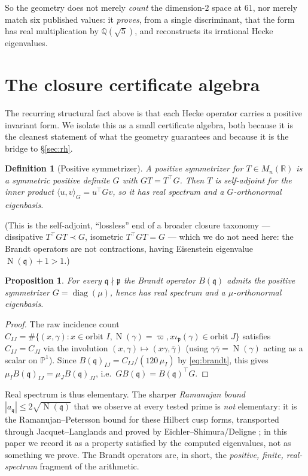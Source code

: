 \documentclass[11pt,a4paper]{article}
\newtheorem{proposition}[theorem]{Proposition}
\newtheorem{definition}[theorem]{Definition}
\newcommand{\Q}{\mathbb{Q}}
\newcommand{\R}{\mathbb{R}}
\newcommand{\PP}{\mathbb{P}}
\newcommand{\fp}{\mathfrak{p}}
\newcommand{\fq}{\mathfrak{q}}
\newcommand{\Brandt}{B}
\DeclareMathOperator{\Nm}{N}
\begin{document}
So the geometry does not merely \emph{count} the dimension-$2$ space at
$61$, nor merely match six published values: it \emph{proves}, from a
single discriminant, that the form has real multiplication by
$\Q(\sqrt5)$, and reconstructs its irrational Hecke eigenvalues.

\section{The closure certificate algebra}\label{sec:cert}

The recurring structural fact above is that each Hecke operator carries
a positive invariant form. We isolate this as a small certificate
algebra, both because it is the cleanest statement of what the geometry
guarantees and because it is the bridge to \S\ref{sec:rh}.

\begin{definition}[Positive symmetrizer]
A \emph{positive symmetrizer} for $T\in M_n(\R)$ is a symmetric positive
definite $G$ with $GT=T^\top G$. Then $T$ is self-adjoint for the inner
product $\langle u,v\rangle_G=u^\top G v$, so it has real spectrum and a
$G$-orthonormal eigenbasis.
\end{definition}

\noindent
(This is the self-adjoint, ``lossless'' end of a broader closure
taxonomy --- dissipative $T^\top GT\prec G$, isometric $T^\top GT=G$ ---
which we do not need here: the Brandt operators are not contractions,
having Eisenstein eigenvalue $\Nm(\fq)+1>1$.)

\begin{proposition}\label{prop:selfadj}
For every $\fq\nmid\fp$ the Brandt operator $\Brandt(\fq)$ admits the
positive symmetrizer $G=\operatorname{diag}(\mu)$, hence has real
spectrum and a $\mu$-orthonormal eigenbasis.
\end{proposition}
\begin{proof}
The raw incidence count $C_{IJ}=\#\{(x,\gamma):x\in\text{orbit }I,
\Nm(\gamma)=\varpi, x\iota_\fp(\gamma)\in\text{orbit }J\}$ satisfies
$C_{IJ}=C_{JI}$ via the involution $(x,\gamma)\mapsto(x\gamma,
\bar\gamma)$ (using $\gamma\bar\gamma=\Nm(\gamma)$ acting as a scalar
on $\PP^1$). Since $\Brandt(\fq)_{IJ}=C_{IJ}/(120\,\mu_I)$ by
\eqref{eq:brandt}, this gives $\mu_I\Brandt(\fq)_{IJ}=
\mu_J\Brandt(\fq)_{JI}$, i.e.\ $G\Brandt(\fq)=\Brandt(\fq)^\top G$.
\end{proof}

\noindent
Real spectrum is thus elementary. The sharper \emph{Ramanujan bound}
$|a_\fq|\le2\sqrt{\Nm(\fq)}$ that we observe at every tested prime is
\emph{not} elementary: it is the Ramanujan--Petersson bound for these
Hilbert cusp forms, transported through Jacquet--Langlands and proved by
Eichler--Shimura/Deligne \cite{JacquetLanglands1970,Eichler1973}; in
this paper we record it as a property satisfied by the computed
eigenvalues, not as something we prove. The Brandt operators are, in
short, the \emph{positive, finite, real-spectrum} fragment of the
arithmetic.
\end{document}
